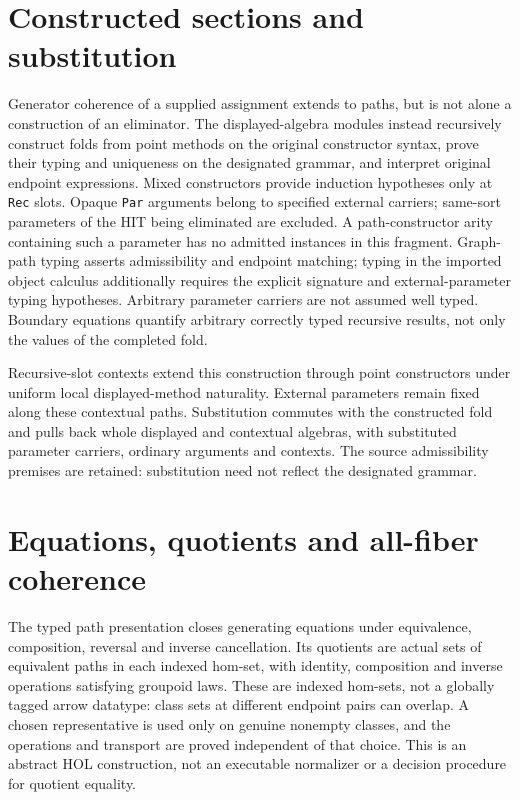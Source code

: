 \documentclass[11pt,a4paper]{article}
\begin{document}
\section{Constructed sections and substitution}
Generator coherence of a supplied assignment extends to paths, but is not
alone a construction of an eliminator. The displayed-algebra modules instead
recursively construct folds from point methods on the original constructor
syntax, prove their typing and uniqueness on the designated grammar, and
interpret original endpoint expressions. Mixed constructors provide
induction hypotheses only at \texttt{Rec} slots. Opaque \texttt{Par} arguments
belong to specified external carriers; same-sort parameters of the HIT being
eliminated are excluded. A path-constructor arity containing such a parameter
has no admitted instances in this fragment. Graph-path typing asserts
admissibility and endpoint matching; typing in the imported object calculus
additionally requires the explicit signature and external-parameter typing
hypotheses. Arbitrary parameter carriers are not assumed well typed.
Boundary equations quantify arbitrary correctly
typed recursive results, not only the values of the completed fold.

Recursive-slot contexts extend this construction through point constructors
under uniform local displayed-method naturality. External parameters remain
fixed along these contextual paths. Substitution commutes with the constructed
fold and pulls back whole displayed and contextual algebras, with substituted
parameter carriers, ordinary arguments and contexts. The source admissibility
premises are retained: substitution need not reflect the designated grammar.

\section{Equations, quotients and all-fiber coherence}
The typed path presentation closes generating equations under equivalence,
composition, reversal and inverse cancellation. Its quotients are actual
sets of equivalent paths in each indexed hom-set, with identity, composition
and inverse operations satisfying groupoid laws. These are indexed hom-sets,
not a globally tagged arrow datatype: class sets at different endpoint pairs
can overlap. A chosen representative is used only on genuine nonempty
classes, and the operations and transport are proved independent of that
choice. This is an abstract HOL construction, not an executable normalizer
or a decision procedure for quotient equality.
\end{document}
